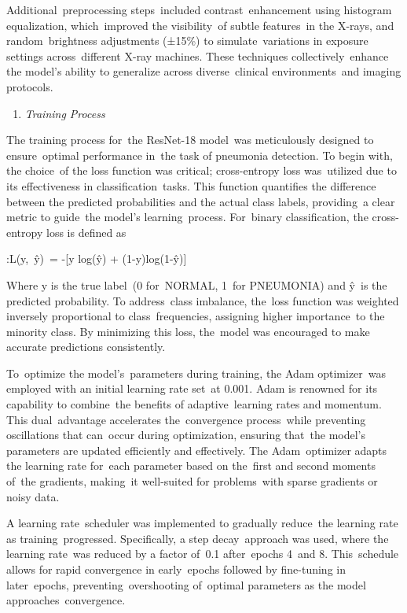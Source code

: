\documentclass[
  twocolumn,
  10pt,
  a4paper,
  journal
]{IEEEtran}
\begin{document}
Additional~preprocessing steps~included contrast~enhancement using
histogram equalization, which~improved the visibility~of subtle
features~in the X-rays, and random~brightness adjustments (±15\%) to
simulate~variations in exposure settings across~different X-ray
machines. These techniques collectively~enhance the
model's ability to generalize across diverse~clinical
environments~and imaging protocols.

\begin{enumerate}
\def\labelenumi{\Alph{enumi}.}
\setcounter{enumi}{4}
\item
  \emph{Training Process}
\end{enumerate}

The training process for~the ResNet-18 model~was meticulously designed
to ensure~optimal performance in~the task of pneumonia detection. To
begin with, the choice~of the loss function was critical; cross-entropy
loss was~utilized due to its effectiveness in classification~tasks. This
function quantifies the difference between the predicted probabilities
and the actual class labels, providing~a clear metric to guide~the
model's learning~process. For~binary classification, the
cross-entropy loss is defined as

:L(y,~ŷ)~= -{[}y log(ŷ) + (1-y)log(1-ŷ){]}

Where y is the true label~(0 for~NORMAL, 1~for PNEUMONIA) and ŷ~is the
predicted probability. To address~class imbalance, the~loss function was
weighted inversely proportional to class~frequencies, assigning higher
importance~to the minority class. By minimizing this loss, the~model was
encouraged to make accurate predictions consistently.

To~optimize the model's~parameters during training, the
Adam optimizer~was employed with an initial learning rate set~at 0.001.
Adam is renowned for its capability to combine~the benefits of
adaptive~learning rates and momentum. This dual~advantage accelerates
the~convergence process~while preventing oscillations that can~occur
during optimization, ensuring that~the model's
parameters are updated efficiently and effectively. The Adam~optimizer
adapts the learning rate for~each parameter based on the~first and
second moments of~the gradients, making~it well-suited for problems~with
sparse gradients or noisy data.

A learning rate~scheduler was implemented to gradually reduce~the
learning rate as training~progressed. Specifically, a step
decay~approach was used, where the learning rate~was reduced by a factor
of~0.1 after~epochs 4~and 8. This~schedule allows for rapid convergence
in early~epochs followed by fine-tuning in later~epochs,
preventing~overshooting of~optimal parameters as the model
approaches~convergence.
\end{document}
